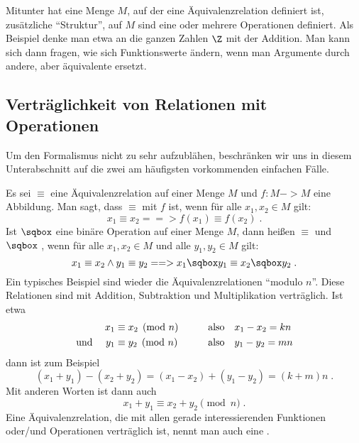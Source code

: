 Mitunter hat eine Menge $M$, auf der eine Äquivalenzrelation definiert
ist, zusätzliche "`Struktur"', \bzw auf $M$ sind eine oder mehrere
Operationen definiert. Als Beispiel denke man etwa an die ganzen
Zahlen $\Z$ mit der Addition. Man kann sich dann \zB fragen, wie sich
Funktionswerte ändern, wenn man Argumente durch andere, aber
äquivalente ersetzt.


\Tut\subsection{Vertr\"aglichkeit von Relationen mit Operationen}
\label{subsub:vertraeglichkeit}

Um den Formalismus nicht zu sehr aufzublähen, beschränken wir uns in
diesem Unterabschnitt auf die zwei am häufigsten vorkommenden
einfachen Fälle.

Es sei $\equiv$ eine Äquivalenzrelation auf einer Menge $M$ und
$f:M->M$ eine Abbildung. Man sagt, dass $\equiv$ mit $f$
 ist, wenn für alle
$x_1,x_2\in M$ gilt:
\[
x_1 \equiv x_2 ==> f(x_1) \equiv f(x_2) \;.
\]
Ist $\sqbox$ eine binäre Operation auf einer Menge $M$, dann heißen
$\equiv$ und $\sqbox$  ,
wenn für alle $x_1,x_2\in M$ und alle $y_1,y_2\in M$ gilt:
\[
x_1 \equiv x_2 \land y_1 \equiv y_2 ==>  x_1\sqbox y_1 \equiv x_2\sqbox y_2 \;.
\]
Ein typisches Beispiel sind wieder die Äquivalenzrelationen "`modulo
$n$"'. Diese Relationen sind mit Addition, Subtraktion und
Multiplikation verträglich. Ist etwa
\begin{alignat*}{2}
  x_1&\equiv x_2 \pmod n &\qquad& \text{also\quad} x_1-x_2 = k n\\
  \text{und \quad} y_1&\equiv y_2 \pmod n && \text{also\quad} y_1-y_2 = m n
\end{alignat*}
dann ist zum Beispiel
\[
(x_1+y_1) - (x_2+y_2) = (x_1-x_2) + (y_1-y_2) = (k+m)n \;.
\]
Mit anderen Worten ist dann auch
\[
x_1+y_1 \equiv x_2+y_2 \pmod n \;.
\]
Eine Äquivalenzrelation, die mit allen gerade interessierenden
Funktionen oder/und Operationen verträglich ist, nennt man auch eine
.


